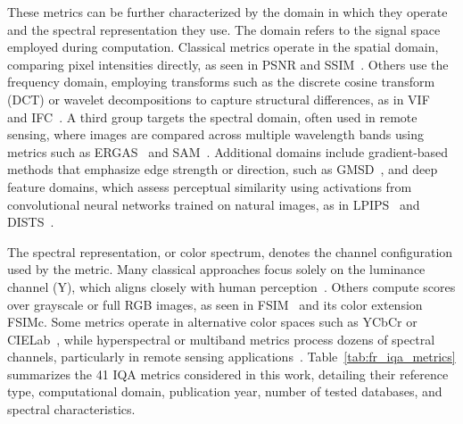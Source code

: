 These metrics can be further characterized by the domain in which they operate and the spectral representation they use. The domain refers to the signal space employed during computation. Classical metrics operate in the spatial domain, comparing pixel intensities directly, as seen in PSNR and SSIM~\cite{Wang2004SSIM}. Others use the frequency domain, employing transforms such as the discrete cosine transform (DCT) or wavelet decompositions to capture structural differences, as in VIF~\cite{sheikh_vif_2006} and IFC~\cite{sheikh2005ifc}. A third group targets the spectral domain, often used in remote sensing, where images are compared across multiple wavelength bands using metrics such as ERGAS~\cite{Ranchin2000ERGAS} and SAM~\cite{Kruse1993SAM}. Additional domains include gradient-based methods that emphasize edge strength or direction, such as GMSD~\cite{Xue2014GMSD}, and deep feature domains, which assess perceptual similarity using activations from convolutional neural networks trained on natural images, as in LPIPS~\cite{zhang2018lpips} and DISTS~\cite{ding2020dists}.

The spectral representation, or color spectrum, denotes the channel configuration used by the metric. Many classical approaches focus solely on the luminance channel (Y), which aligns closely with human perception~\cite{sheikh_vif_2006, chandler2007vsnr}. Others compute scores over grayscale or full RGB images, as seen in FSIM~\cite{zhang2011fsim} and its color extension FSIMc. Some metrics operate in alternative color spaces such as YCbCr or CIELab~\cite{Wang2002PQM}, while hyperspectral or multiband metrics process dozens of spectral channels, particularly in remote sensing applications~\cite{Zhou1998SCC,Alparone2008QNR}. Table~\ref{tab:fr_iqa_metrics} summarizes the 41 IQA metrics considered in this work, detailing their reference type, computational domain, publication year, number of tested databases, and spectral characteristics.


